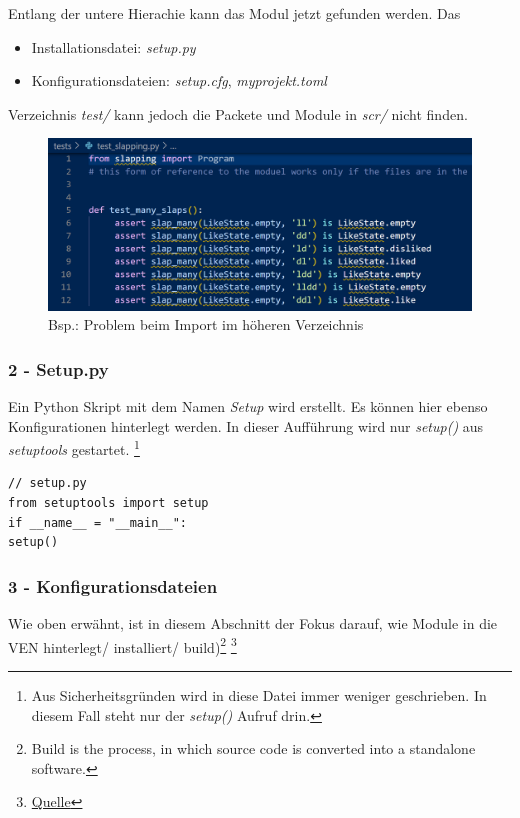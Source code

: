 Entlang der untere Hierachie kann das Modul jetzt gefunden werden. Das
\begin{itemize}
 \item Installationsdatei: \textit{setup.py}
	\item Konfigurationsdateien: \textit{setup.cfg}, \textit{myprojekt.toml}
\end{itemize} Verzeichnis \textit{test/} kann jedoch die Packete und Module in \textit{scr/} nicht finden.
\begin{figure}[H]
	\centering
	\includegraphics[scale = 0.8]{attachment/chapter_2/Scc071}
	\caption{Bsp.: Problem beim Import im höheren Verzeichnis}
\end{figure}

\subsubsection{2 - Setup.py}
Ein Python Skript mit dem Namen \textit{Setup} wird erstellt. Es können hier ebenso Konfigurationen hinterlegt werden. In dieser Aufführung wird nur \textit{setup()} aus \textit{setuptools} gestartet. \footnote{Aus Sicherheitsgründen wird in diese Datei immer weniger geschrieben. In diesem Fall steht nur der \textit{setup()} Aufruf drin.}
\begin{lstlisting}[style=python]
// setup.py
from setuptools import setup
if __name__ = "__main__":
setup()
\end{lstlisting}

\subsubsection{3 - Konfigurationsdateien}
Wie oben erwähnt, ist in diesem Abschnitt der Fokus darauf, wie Module in die \gls{VEN} hinterlegt/ installiert/ build)\footnote{
	Build is the process, in which source code is converted into a standalone software.
} \footnote{
	\href{https://setuptools.pypa.io/en/latest/userguide/pyproject_config.html}{Quelle}
}

